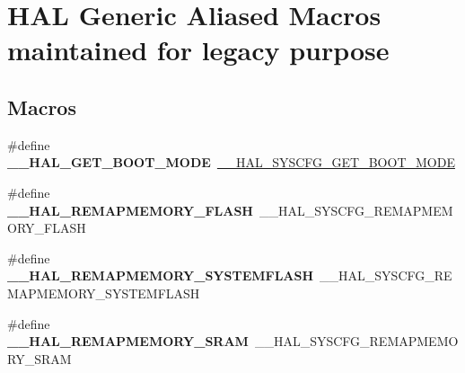 \hypertarget{group___h_a_l___aliased___macros}{}\section{H\+AL Generic Aliased Macros maintained for legacy purpose}
\label{group___h_a_l___aliased___macros}
\subsection*{Macros}
\begin{DoxyCompactItemize}
\item 
\mbox{\label{group___h_a_l___aliased___macros_ga39fe1e2b6eddc3101d95ffb9f1fdfc03}} 
\#define {\bfseries \+\_\+\+\_\+\+H\+A\+L\+\_\+\+G\+E\+T\+\_\+\+B\+O\+O\+T\+\_\+\+M\+O\+DE}~\mbox{\hyperlink{group___h_a_l___exported___macros_ga0e71eb2b553f1a7b8172710184a89caa}{\+\_\+\+\_\+\+H\+A\+L\+\_\+\+S\+Y\+S\+C\+F\+G\+\_\+\+G\+E\+T\+\_\+\+B\+O\+O\+T\+\_\+\+M\+O\+DE}}
\item 
\mbox{\label{group___h_a_l___aliased___macros_ga981a56c85b0612c1085c1d84cf879b35}} 
\#define {\bfseries \+\_\+\+\_\+\+H\+A\+L\+\_\+\+R\+E\+M\+A\+P\+M\+E\+M\+O\+R\+Y\+\_\+\+F\+L\+A\+SH}~\+\_\+\+\_\+\+H\+A\+L\+\_\+\+S\+Y\+S\+C\+F\+G\+\_\+\+R\+E\+M\+A\+P\+M\+E\+M\+O\+R\+Y\+\_\+\+F\+L\+A\+SH
\item 
\mbox{\label{group___h_a_l___aliased___macros_ga476dbd120dafe0fbe3e1e090f85d01ae}} 
\#define {\bfseries \+\_\+\+\_\+\+H\+A\+L\+\_\+\+R\+E\+M\+A\+P\+M\+E\+M\+O\+R\+Y\+\_\+\+S\+Y\+S\+T\+E\+M\+F\+L\+A\+SH}~\+\_\+\+\_\+\+H\+A\+L\+\_\+\+S\+Y\+S\+C\+F\+G\+\_\+\+R\+E\+M\+A\+P\+M\+E\+M\+O\+R\+Y\+\_\+\+S\+Y\+S\+T\+E\+M\+F\+L\+A\+SH
\item 
\mbox{\label{group___h_a_l___aliased___macros_ga8ac9efd3dae480b2d5d6487ddf0f1750}} 
\#define {\bfseries \+\_\+\+\_\+\+H\+A\+L\+\_\+\+R\+E\+M\+A\+P\+M\+E\+M\+O\+R\+Y\+\_\+\+S\+R\+AM}~\+\_\+\+\_\+\+H\+A\+L\+\_\+\+S\+Y\+S\+C\+F\+G\+\_\+\+R\+E\+M\+A\+P\+M\+E\+M\+O\+R\+Y\+\_\+\+S\+R\+AM
\item 
\mbox{\label{group___h_a_l___aliased___macros_gaa188d9f34a61a5601aefa808e8d3053e}} 

\end{DoxyCompactItemize}
